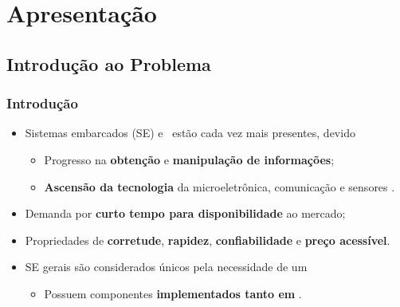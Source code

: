 \section{Apresentação}

   \subsection{Introdução ao Problema}
      \begin{frame}
         \frametitle{Introdução}
         \begin{itemize}
            \setlength{\itemsep}{1.3em}
            \item Sistemas embarcados (SE) e \wearables\ estão cada vez mais presentes, devido
            \begin{itemize} \setlength{\itemsep}{0.3em}
               \item Progresso na \textbf{obtenção} e \textbf{manipulação de informações};
               \item \textbf{Ascensão da tecnologia} da microeletrônica, comunicação e sensores \cite{Jozwiak2017}.
            \end{itemize}
            
            \item Demanda por \textbf{curto tempo para disponibilidade} ao mercado;
            \item Propriedades de \textbf{corretude}, \textbf{rapidez}, \textbf{confiabilidade} e \textbf{preço acessível}.
            
            
            \item SE gerais são considerados únicos pela necessidade de um \codesign\ \cite{Wolf1994}
            \begin{itemize}
               
               \item Possuem componentes \textbf{implementados tanto em \hs}.
            \end{itemize}
            
         \end{itemize}
      \end{frame}
      

